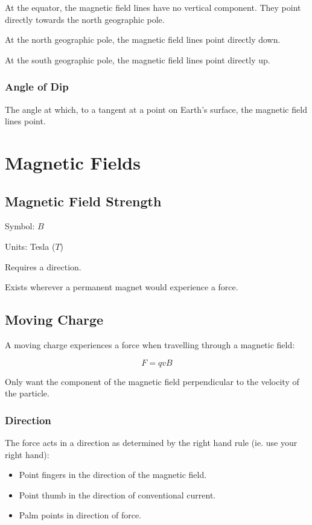 \documentclass[a4paper,11pt]{article}
\begin{document}
At the equator, the magnetic field lines have no vertical component. They point
directly towards the north geographic pole.

At the north geographic pole, the magnetic field lines point directly down.

At the south geographic pole, the magnetic field lines point directly up.


\subsubsection{Angle of Dip}

The angle at which, to a tangent at a point on Earth's surface, the magnetic
field lines point.




\section{Magnetic Fields}

\subsection{Magnetic Field Strength}

Symbol: $B$

Units: Tesla ($T$)

Requires a direction.

Exists wherever a permanent magnet would experience a force.


\subsection{Moving Charge}

A moving charge experiences a force when travelling through a magnetic field:

$$
F = qvB
$$

Only want the component of the magnetic field perpendicular to the velocity
of the particle.


\subsubsection{Direction}

The force acts in a direction as determined by the right hand rule (ie. use
your right hand):

\begin{itemize}
\item Point fingers in the direction of the magnetic field.
\item Point thumb in the direction of conventional current.
\item Palm points in direction of force.
\end{itemize}
\end{document}
